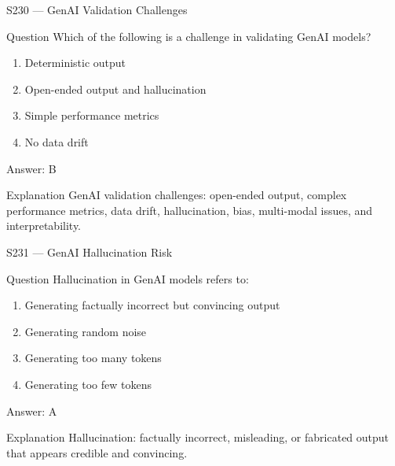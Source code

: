 \documentclass[aspectratio=169,8pt]{beamer}
\begin{document}
	\begin{frame}{S230 --- GenAI Validation Challenges}
		\begin{block}{Question}
			Which of the following is a challenge in validating GenAI models?
			\begin{enumerate}
				\item Deterministic output
				\item Open-ended output and hallucination
				\item Simple performance metrics
				\item No data drift
			\end{enumerate}
		\end{block}
		\begin{exampleblock}{Answer: B}\end{exampleblock}
		\begin{block}{Explanation}
			GenAI validation challenges: open-ended output, complex performance metrics, data drift, hallucination, bias, multi-modal issues, and interpretability.
		\end{block}
	\end{frame}
	
	\begin{frame}{S231 --- GenAI Hallucination Risk}
		\begin{block}{Question}
			Hallucination in GenAI models refers to:
			\begin{enumerate}
				\item Generating factually incorrect but convincing output
				\item Generating random noise
				\item Generating too many tokens
				\item Generating too few tokens
			\end{enumerate}
		\end{block}
		\begin{exampleblock}{Answer: A}\end{exampleblock}
		\begin{block}{Explanation}
			Hallucination: factually incorrect, misleading, or fabricated output that appears credible and convincing.
		\end{block}
	\end{frame}
	
\end{document}

